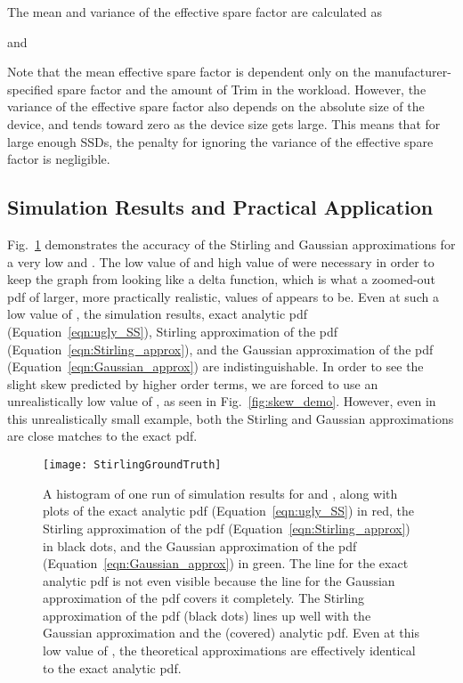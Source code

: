 \documentclass[prodmode,acmtos]{acmsmall}
\begin{document}
The mean and variance of the effective spare factor are calculated as

and

Note that the mean effective spare factor is dependent only on the manufacturer-specified spare factor and the amount of Trim in the workload.  However, the variance of the effective spare factor also depends on the absolute size of the device, and tends toward zero as the device size gets large.  This means that for large enough SSDs, the penalty for ignoring the variance of the effective spare factor is negligible.

\subsection{Simulation Results and Practical Application}
Fig.~\ref{fig:StirlingGroundTruth} demonstrates the accuracy of the Stirling and Gaussian approximations for a very low  and .  The low value of  and high value of  were necessary in order to keep the graph from looking like a delta function, which is what a zoomed-out pdf of larger, more practically realistic, values of  appears to be.  Even at such a low value of , the simulation results, exact analytic pdf (Equation~\ref{eqn:ugly_SS}), Stirling approximation of the pdf (Equation~\ref{eqn:Stirling_approx}), and the Gaussian approximation of the pdf (Equation~\ref{eqn:Gaussian_approx}) are indistinguishable.  In order to see the slight skew predicted by higher order terms, we are forced to use an unrealistically low value of , as seen in Fig.~\ref{fig:skew_demo}.  However, even in this unrealistically small example, both the Stirling and Gaussian approximations are close matches to the exact pdf. 

\begin{figure}
\centerline{\texttt{[image: StirlingGroundTruth]}}
\caption{A histogram of one run of simulation results for  and , along with plots of the exact analytic pdf (Equation~\ref{eqn:ugly_SS}) in red, the Stirling approximation of the pdf (Equation~\ref{eqn:Stirling_approx}) in black dots, and the Gaussian approximation of the pdf (Equation~\ref{eqn:Gaussian_approx}) in green.  The line for the exact analytic pdf is not even visible because the line for the Gaussian approximation of the pdf covers it completely.  The Stirling approximation of the pdf (black dots) lines up well with the Gaussian approximation and the (covered) analytic pdf.  Even at this low value of , the theoretical approximations are effectively identical to the exact analytic pdf.}
\label{fig:StirlingGroundTruth}
\end{figure}
\end{document}
